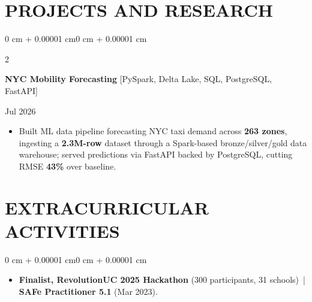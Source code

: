 \documentclass[10pt, letterpaper]{article}
\newenvironment{highlights}{
    \begin{itemize}[
        topsep=0.10 cm,
        parsep=0.06 cm,
        partopsep=0pt,
        itemsep=0.06 cm,
        leftmargin=12pt
    ]
}{
    \end{itemize}
}
\newenvironment{onecolentry}{
    \begin{adjustwidth}{0 cm + 0.00001 cm}{0 cm + 0.00001 cm}
}{
    \end{adjustwidth}
}
\newenvironment{twocolentry}[2][]{
    \onecolentry
    \def\secondColumn{#2}
    \setcolumnwidth{\fill, 4.5 cm}
    \begin{paracol}{2}
}{
    \switchcolumn \raggedleft \secondColumn
    \end{paracol}
    \endonecolentry
}
\begin{document}
\section{PROJECTS AND RESEARCH}
\begin{twocolentry}{Jul 2026}
\textbf{NYC Mobility Forecasting} [PySpark, Delta Lake, SQL, PostgreSQL, FastAPI]
\end{twocolentry}
\begin{highlights}
  \item Built ML data pipeline forecasting NYC taxi demand across \textbf{263 zones}, ingesting a \textbf{2.3M-row} dataset through a Spark-based bronze/silver/gold data warehouse; served predictions via FastAPI backed by PostgreSQL, cutting RMSE \textbf{43\%} over baseline.
\end{highlights}

\section{EXTRACURRICULAR ACTIVITIES}
\begin{onecolentry}
\begin{highlights}
  \item \textbf{Finalist, RevolutionUC 2025 Hackathon} (300 participants, 31 schools) \,|\, \textbf{SAFe Practitioner 5.1} (Mar 2023).
\end{highlights}
\end{onecolentry}
\end{document}
